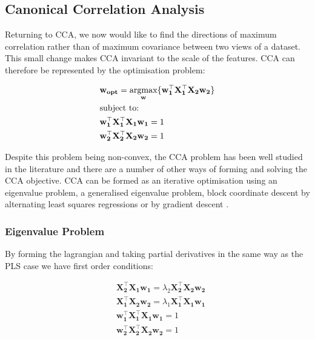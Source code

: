 \subsection{Canonical Correlation Analysis}\label{sec:cca}

Returning to CCA, we now would like to find the directions of maximum correlation rather than of maximum covariance between two views of a dataset. This small change makes CCA invariant to the scale of the features. CCA can therefore be represented by the optimisation problem:

\begin{align}
     & \mathbf{w_{opt}}=\underset{\mathbf{w}}{\mathrm{argmax}}\{ \mathbf{w_1^{\top}X_1^{\top}X_2w_2}  \} \\
     & \text{subject to:} \notag                                                                         \\
     & \mathbf{w_1^{\top}X_1^{\top}X_1w_1}=1 \notag                                                      \\
     & \mathbf{w_2^{\top}X_2^{\top}X_2w_2}=1 \notag
\end{align}

Despite this problem being non-convex, the CCA problem has been well studied in the literature and there are a number of other ways of forming and solving the CCA objective. CCA can be formed as an iterative optimisation using an eigenvalue problem, a generalised eigenvalue problem, block coordinate descent by alternating least squares regressions \cite{golub1995canonical} \cite{sun2008least} or by gradient descent \cite{via2007learning}.

\subsubsection{Eigenvalue Problem}

By forming the lagrangian and taking partial derivatives in the same way as the PLS case we have first order conditions:

\begin{align}\label{CCA:FOCs}
     & \mathbf{X_2^{\top}X_1w_1}=\lambda_2 \mathbf{X_2^{\top}X_2w_2} \\
     & \mathbf{X_1^{\top}X_2w_2}=\lambda_1 \mathbf{X_1^{\top}X_1w_1} \\
     & \mathbf{w_1^{\top}X_1^{\top}X_1w_1}=1                         \\
     & \mathbf{w_2^{\top}X_2^{\top}X_2w_2}=1
\end{align}

